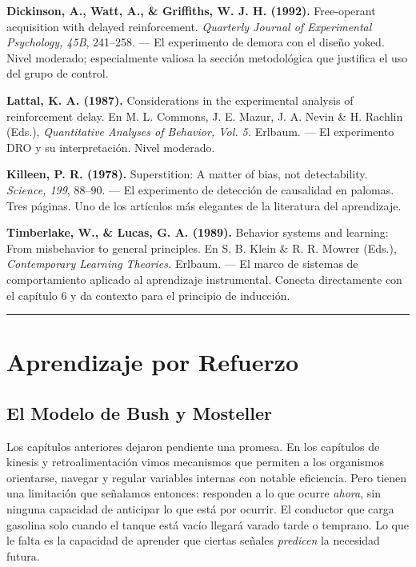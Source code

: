 \documentclass[
  letterpaper,
  DIV=11,
  numbers=noendperiod]{scrreprt}
\begin{document}
\begin{tcolorbox}[enhanced jigsaw, toprule=.15mm, arc=.35mm, colback=white, opacityback=0, colframe=quarto-callout-note-color-frame, breakable, rightrule=.15mm, left=2mm, leftrule=.75mm, bottomrule=.15mm]
\textbf{Dickinson, A., Watt, A., \& Griffiths, W. J. H. (1992).}
Free-operant acquisition with delayed reinforcement. \emph{Quarterly
Journal of Experimental Psychology, 45B}, 241--258. --- El experimento
de demora con el diseño yoked. Nivel moderado; especialmente valiosa la
sección metodológica que justifica el uso del grupo de control.

\textbf{Lattal, K. A. (1987).} Considerations in the experimental
analysis of reinforcement delay. En M. L. Commons, J. E. Mazur, J. A.
Nevin \& H. Rachlin (Eds.), \emph{Quantitative Analyses of Behavior,
Vol. 5.} Erlbaum. --- El experimento DRO y su interpretación. Nivel
moderado.

\textbf{Killeen, P. R. (1978).} Superstition: A matter of bias, not
detectability. \emph{Science, 199}, 88--90. --- El experimento de
detección de causalidad en palomas. Tres páginas. Uno de los artículos
más elegantes de la literatura del aprendizaje.

\textbf{Timberlake, W., \& Lucas, G. A. (1989).} Behavior systems and
learning: From misbehavior to general principles. En S. B. Klein \& R.
R. Mowrer (Eds.), \emph{Contemporary Learning Theories.} Erlbaum. --- El
marco de sistemas de comportamiento aplicado al aprendizaje
instrumental. Conecta directamente con el capítulo 6 y da contexto para
el principio de inducción.

\begin{center}\rule{0.5\linewidth}{0.5pt}\end{center}


\chapter{Aprendizaje por Refuerzo}\label{aprendizaje-por-refuerzo}

\section{El Modelo de Bush y
Mosteller}\label{el-modelo-de-bush-y-mosteller}

Los capítulos anteriores dejaron pendiente una promesa. En los capítulos
de kinesis y retroalimentación vimos mecanismos que permiten a los
organismos orientarse, navegar y regular variables internas con notable
eficiencia. Pero tienen una limitación que señalamos entonces: responden
a lo que ocurre \emph{ahora}, sin ninguna capacidad de anticipar lo que
está por ocurrir. El conductor que carga gasolina solo cuando el tanque
está vacío llegará varado tarde o temprano. Lo que le falta es la
capacidad de aprender que ciertas señales \emph{predicen} la necesidad
futura.


\end{tcolorbox}
\end{document}
